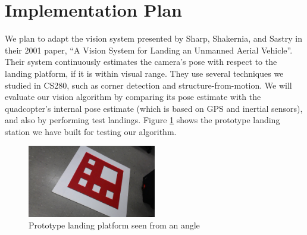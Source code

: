 \section*{Implementation Plan}

We plan to adapt the vision system presented by Sharp, Shakernia, and Sastry in
their 2001 paper, ``A Vision System for Landing an Unmanned Aerial Vehicle''.
Their system continuously estimates the camera's pose with respect to the
landing platform, if it is within visual range. They use several techniques we
studied in CS280, such as corner detection and structure-from-motion. We will
evaluate our vision algorithm by comparing its pose estimate with the
quadcopter's internal pose estimate (which is based on GPS and inertial
sensors), and also by performing test landings. Figure \ref{fig:platform} shows
the prototype landing station we have built for testing our algorithm.

\begin{figure}[h!]
    \centering
    \includegraphics[width=0.5\textwidth]{platform.jpg}
    \caption{Prototype landing platform seen from an angle}
    \label{fig:platform}
\end{figure}
